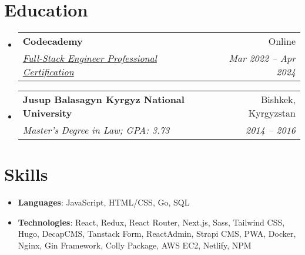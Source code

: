 \documentclass[letterpaper,11pt]{article}
\makeatletter
\newcommand{\resumeSubheading}[4]{
  \vspace{-1pt}\item
    \begin{tabular*}{0.97\textwidth}[t]{l@{\extracolsep{\fill}}r}
      \textbf{#1} & #2 \\
      \textit{\small#3} & \textit{\small #4} \\
    \end{tabular*}\vspace{-5pt}
}
\newcommand{\resumeSubHeadingListStart}{\begin{itemize}[leftmargin=*]}
\newcommand{\resumeSubHeadingListEnd}{\end{itemize}}
\makeatother
\begin{document}

\section{Education}
  \resumeSubHeadingListStart
    \resumeSubheading
      {Codecademy}{Online}
      {\href{https://www.codecademy.com/profiles/BeksultanAbdikaarov/certificates/ffd0f42cce1a44e9a0108b365047a0a6}{Full-Stack Engineer Professional Certification}}{Mar 2022 -- Apr 2024}
    \resumeSubheading
      {Jusup Balasagyn Kyrgyz National University}{Bishkek, Kyrgyzstan}
      {Master's Degree in Law; GPA: 3.73}{2014 -- 2016}
  \resumeSubHeadingListEnd

%
\section{Skills}
 \resumeSubHeadingListStart
   \item{
     \textbf{Languages}{: JavaScript, HTML/CSS, Go, SQL}
   }
   \item{
     \textbf{Technologies}{: React, Redux, React Router, Next.js, Sass, Tailwind CSS, Hugo, DecapCMS, Tanstack Form, ReactAdmin, Strapi CMS, PWA, Docker, Nginx, Gin Framework, Colly Package, AWS EC2, Netlify, NPM}
   }
 \resumeSubHeadingListEnd

\end{document}

